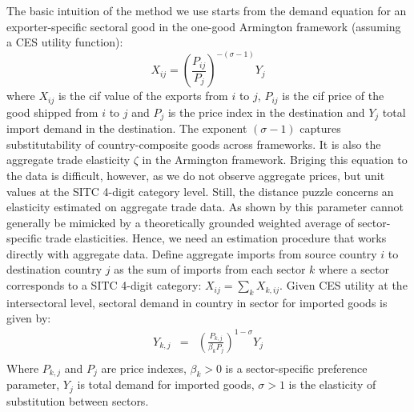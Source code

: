 \documentclass[12pt,twoside,a4paper,notitlepage]{article}
\begin{document}
The basic intuition of the method we use starts from the demand equation for an exporter-specific sectoral good in the one-good Armington framework (assuming a CES utility function):
\[{{X}_{ij}}={{\left( \frac{{{P}_{ij}}}{{{P}_{j}}} \right)}^{-(\sigma -1)}}{{Y}_{j}}\]
where ${X}_{ij}$ is the cif value of the exports from $i$ to $j$, ${{P}_{ij}}$ is the cif price of the good shipped from $i$ to $j$ and ${{P}_{j}}$ is the price index in the destination and ${{Y}_{j}}$ total import demand in the destination.
The exponent $\left( \sigma -1 \right)$ captures substitutability of country-composite goods across frameworks.
It is also the aggregate trade elasticity $\zeta $ in the Armington framework.
Briging this equation to the data is difficult, however, as we do not observe aggregate prices, but unit values at the SITC 4-digit category level.
Still, the distance puzzle concerns an elasticity estimated on aggregate trade data.
As shown by \cite{Imbs2015} this parameter cannot generally be mimicked by a theoretically grounded weighted average of sector-specific trade elasticities.
Hence, we need an estimation procedure that works directly with aggregate data.
Define aggregate imports from source country $i$ to destination country $j$  as the sum of imports from each sector $k$ where a sector corresponds to a SITC 4-digit category: ${{X}_{ij}}=\sum\limits_{k}{{{X}_{k,ij}}}$.
Given CES utility at the intersectoral level, sectoral demand in country  in sector  for imported goods is given by: 
\[\begin{array}{*{35}{l}}
   {{Y}_{k,j}} & = & {{\left( \frac{{{P}_{k,j}}}{{{\beta }_{k}}{{P}_{j}}} \right)}^{1-\sigma }}{{Y}_{j}}  \\
\end{array}\]
Where ${{P}_{k,j}}$ and ${{P}_{j}}$ are price indexes, ${{\beta }_{k}}>0$ is a sector-specific preference parameter, ${{Y}_{j}}$ is total demand for imported goods, $\sigma >1$ is the elasticity of substitution between sectors.
\end{document}
